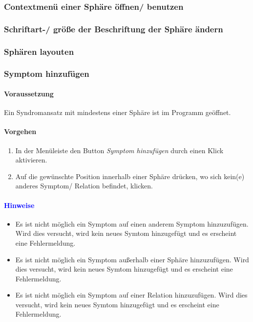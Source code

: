 \documentclass[enabledeprecatedfontcommands,fontsize=11pt,paper=a4,twoside]{scrartcl}
\newcommand*{\hint}{\textcolor{blue}{Hinweise}}
\begin{document}
		\subsubsection{Contextmenü einer Sphäre öffnen/ benutzen}
		\subsubsection{Schriftart-/ größe der Beschriftung der Sphäre ändern}
		\subsubsection{Sphären layouten}
		\newpage
		\subsubsection{Symptom hinzufügen}
		\paragraph{Voraussetzung}
		Ein Syndromansatz mit mindestens einer Sphäre ist im Programm geöffnet. \\
		\paragraph{Vorgehen}
		\begin{enumerate}
			\item In der Menüleiste den Button \textit{Symptom hinzufügen} durch einen Klick aktivieren.
			\item Auf die gewünschte Position innerhalb einer Sphäre drücken, wo sich kein(e) anderes Symptom/ Relation befindet, klicken.
		\end{enumerate}
		\paragraph{\hint}
		\begin{itemize}
			\item Es ist nicht möglich ein Symptom auf einen anderem Symptom hinzuzufügen. Wird dies versucht, wird kein neues Symtom hinzugefügt und es erscheint eine Fehlermeldung.
			\item Es ist nicht möglich ein Symptom außerhalb einer Sphäre hinzuzufügen. Wird dies versucht, wird kein neues Symtom hinzugefügt und es erscheint eine Fehlermeldung.
			\item Es ist nicht möglich ein Symptom auf einer Relation hinzuzufügen. Wird dies versucht, wird kein neues Symtom hinzugefügt und es erscheint eine Fehlermeldung.
		
		\end{itemize}
		\newpage
\end{document}
